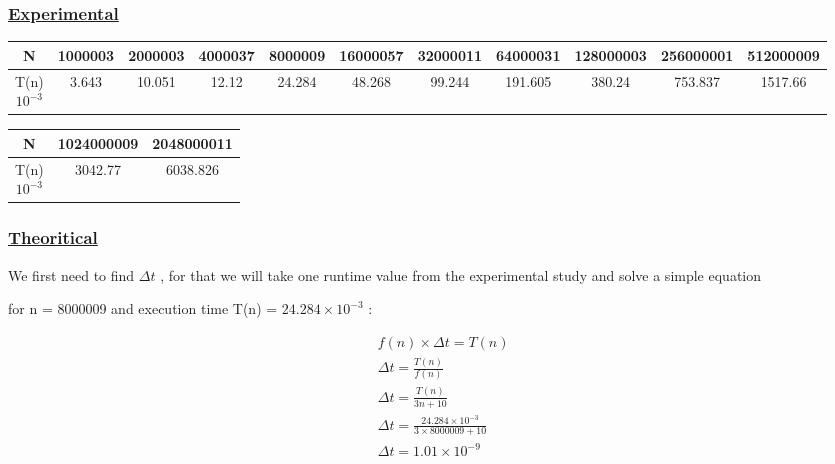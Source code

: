 \subsubsection*{\underline{Experimental}}

\begin{tabular}{|c|c|c|c|c|c|c|c|c|c|c|}
\hline
N & 1000003 & 2000003 & 4000037 & 8000009 & 16000057 & 32000011 & 64000031 & 128000003 & 256000001 & 512000009 \\
\hline
\makecell{T(n)\\\(10^{-3}\)} & 3.643 & 10.051 & 12.12 & 24.284 & 48.268 & 99.244 & 191.605 & 380.24 & 753.837 & 1517.66\\
\hline
\end{tabular}

\vspace{0.25cm}

\begin{tabular}{|c|c|c|}
    \hline
    N & 1024000009 & 2048000011\\
    \hline
    \makecell{T(n)\\\(10^{-3}\)}  & 3042.77 & 6038.826\\
    \hline
\end{tabular}

\vspace{0.5cm}


\subsubsection*{\underline{Theoritical}}
We first need to find  \(\Delta t\) , for that we will take one runtime value from the experimental study and solve a simple equation 

\vspace{0.15cm}

for n = 8000009 and execution time T(n) = \(24.284\times10^{-3}\) :

\vspace{0.75cm}
\begin{align*}
&f(n)\times\Delta t = T(n)\\[0.15cm]
&\Delta t = \frac{T(n)}{f(n)} \\[0.15cm]
&\Delta t = \frac{T(n)}{3n + 10}\\[0.15cm]
&\Delta t = \frac{24.284\times10^{-3}}{3\times 8000009 + 10} \\[0.15cm]
&\boxed{\Delta t = 1.01\times10^{-9}}
\end{align*}



